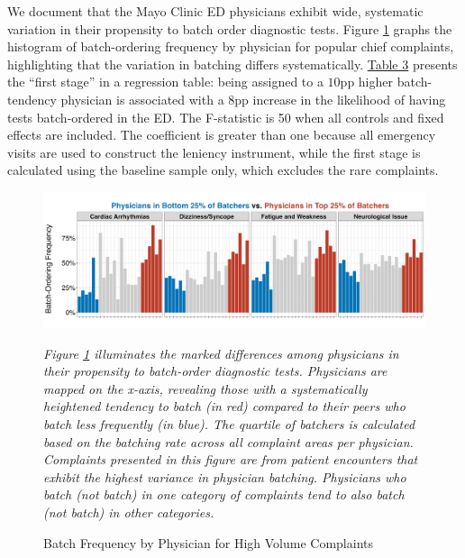\documentclass[,,nonblindrev]{informs}
\begin{document}
We document that the Mayo Clinic ED physicians exhibit wide, systematic
variation in their propensity to batch order diagnostic tests. Figure
\ref{fig:physician_batching} graphs the histogram of batch-ordering
frequency by physician for popular chief complaints, highlighting that
the variation in batching differs systematically.
\hyperref[tab:regression]{Table 3} presents the ``first stage'' in a
regression table: being assigned to a \(10\)pp higher batch-tendency
physician is associated with a \(8\)pp increase in the likelihood of
having tests batch-ordered in the ED. The F-statistic is 50 when all
controls and fixed effects are included. The coefficient is greater than
one because all emergency visits are used to construct the leniency
instrument, while the first stage is calculated using the baseline
sample only, which excludes the rare complaints.

\begin{figure}[h]
  \centering
  \caption{Batch Frequency by Physician for High Volume Complaints}
  \label{fig:physician_batching}
  \includegraphics[width=1\textwidth]{../outputs/figures/Figure 2.png}
\begin{tablenotes}
\tiny
\item \textit{Figure \ref{fig:physician_batching} illuminates the marked differences among physicians in their propensity to batch-order diagnostic tests. Physicians are mapped on the x-axis, revealing those with a systematically heightened tendency to batch (in red) compared to their peers who batch less frequently (in blue). The quartile of batchers is calculated based on the batching rate across all complaint areas per physician. Complaints presented in this figure are from patient encounters that exhibit the highest variance in physician batching. Physicians who batch (not batch) in one category of complaints tend to also batch (not batch) in other categories.}
\end{tablenotes}  
\end{figure}
\end{document}
